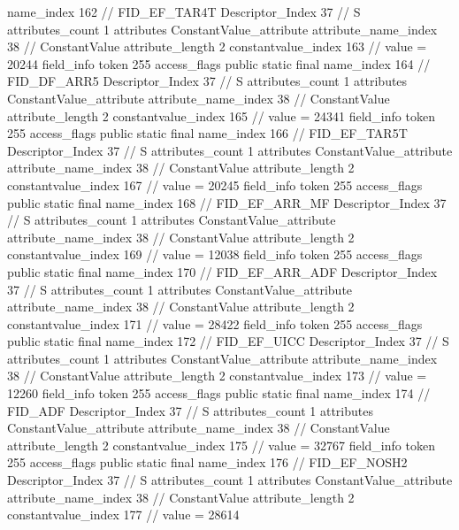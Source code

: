 {{{{{				name_index	162		// FID_EF_TAR4T
				Descriptor_Index	37		// S
				attributes_count	1
				attributes {
				ConstantValue_attribute {
					attribute_name_index	38		// ConstantValue
					attribute_length	2
					constantvalue_index	163		// value = 20244
				}
				}
			}
			field_info {
				token	255
				access_flags	public static final
				name_index	164		// FID_DF_ARR5
				Descriptor_Index	37		// S
				attributes_count	1
				attributes {
				ConstantValue_attribute {
					attribute_name_index	38		// ConstantValue
					attribute_length	2
					constantvalue_index	165		// value = 24341
				}
				}
			}
			field_info {
				token	255
				access_flags	public static final
				name_index	166		// FID_EF_TAR5T
				Descriptor_Index	37		// S
				attributes_count	1
				attributes {
				ConstantValue_attribute {
					attribute_name_index	38		// ConstantValue
					attribute_length	2
					constantvalue_index	167		// value = 20245
				}
				}
			}
			field_info {
				token	255
				access_flags	public static final
				name_index	168		// FID_EF_ARR_MF
				Descriptor_Index	37		// S
				attributes_count	1
				attributes {
				ConstantValue_attribute {
					attribute_name_index	38		// ConstantValue
					attribute_length	2
					constantvalue_index	169		// value = 12038
				}
				}
			}
			field_info {
				token	255
				access_flags	public static final
				name_index	170		// FID_EF_ARR_ADF
				Descriptor_Index	37		// S
				attributes_count	1
				attributes {
				ConstantValue_attribute {
					attribute_name_index	38		// ConstantValue
					attribute_length	2
					constantvalue_index	171		// value = 28422
				}
				}
			}
			field_info {
				token	255
				access_flags	public static final
				name_index	172		// FID_EF_UICC
				Descriptor_Index	37		// S
				attributes_count	1
				attributes {
				ConstantValue_attribute {
					attribute_name_index	38		// ConstantValue
					attribute_length	2
					constantvalue_index	173		// value = 12260
				}
				}
			}
			field_info {
				token	255
				access_flags	public static final
				name_index	174		// FID_ADF
				Descriptor_Index	37		// S
				attributes_count	1
				attributes {
				ConstantValue_attribute {
					attribute_name_index	38		// ConstantValue
					attribute_length	2
					constantvalue_index	175		// value = 32767
				}
				}
			}
			field_info {
				token	255
				access_flags	public static final
				name_index	176		// FID_EF_NOSH2
				Descriptor_Index	37		// S
				attributes_count	1
				attributes {
				ConstantValue_attribute {
					attribute_name_index	38		// ConstantValue
					attribute_length	2
					constantvalue_index	177		// value = 28614
}}}}}}}
